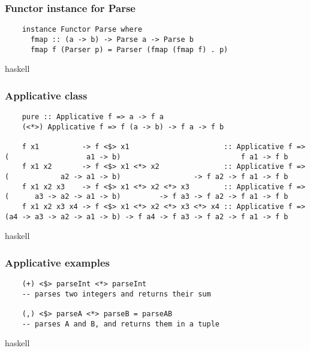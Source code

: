 \documentclass{beamer}
\begin{document}
\begin{frame}
  \frametitle{Functor instance for Parse}

  \begin{verbatim}
    instance Functor Parse where
      fmap :: (a -> b) -> Parse a -> Parse b
      fmap f (Parser p) = Parser (fmap (fmap f) . p)
  \end{verbatim}{haskell}


\end{frame}




\begin{frame}
  \frametitle{Applicative class}

  \begin{verbatim}
    pure :: Applicative f => a -> f a
    (<*>) Applicative f => f (a -> b) -> f a -> f b

    f x1          -> f <$> x1                      :: Applicative f => (                  a1 -> b)                            f a1 -> f b
    f x1 x2       -> f <$> x1 <*> x2               :: Applicative f => (            a2 -> a1 -> b)                 -> f a2 -> f a1 -> f b
    f x1 x2 x3    -> f <$> x1 <*> x2 <*> x3        :: Applicative f => (      a3 -> a2 -> a1 -> b)         -> f a3 -> f a2 -> f a1 -> f b
    f x1 x2 x3 x4 -> f <$> x1 <*> x2 <*> x3 <*> x4 :: Applicative f => (a4 -> a3 -> a2 -> a1 -> b) -> f a4 -> f a3 -> f a2 -> f a1 -> f b
  \end{verbatim}{haskell}

\end{frame}


\begin{frame}
  \frametitle{Applicative examples}

  \begin{verbatim}
    (+) <$> parseInt <*> parseInt
    -- parses two integers and returns their sum

    (,) <$> parseA <*> parseB = parseAB
    -- parses A and B, and returns them in a tuple
  \end{verbatim}{haskell}

\end{frame}
\end{document}
